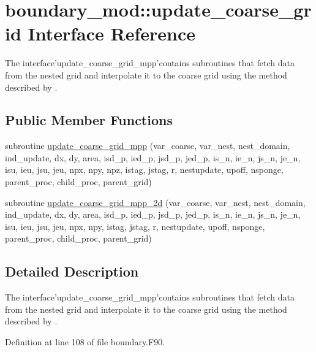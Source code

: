 \section{boundary\-\_\-mod\-:\-:update\-\_\-coarse\-\_\-grid Interface Reference}
\label{interfaceboundary__mod_1_1update__coarse__grid}


The interface'update\-\_\-coarse\-\_\-grid\-\_\-mpp'contains subroutines that fetch data from the nested grid and interpolate it to the coarse grid using the method described by \cite{harris2013two}.  


\subsection*{Public Member Functions}
\begin{DoxyCompactItemize}
\item 
subroutine \hyperlink{interfaceboundary__mod_1_1update__coarse__grid_a6d38bb2a38da012a2464e7255edd6983}{update\-\_\-coarse\-\_\-grid\-\_\-mpp} (var\-\_\-coarse, var\-\_\-nest, nest\-\_\-domain, ind\-\_\-update, dx, dy, area, isd\-\_\-p, ied\-\_\-p, jsd\-\_\-p, jed\-\_\-p, is\-\_\-n, ie\-\_\-n, js\-\_\-n, je\-\_\-n, isu, ieu, jsu, jeu, npx, npy, npz, istag, jstag, r, nestupdate, upoff, nsponge, parent\-\_\-proc, child\-\_\-proc, parent\-\_\-grid)
\item 
subroutine \hyperlink{interfaceboundary__mod_1_1update__coarse__grid_a5a1f8f85dffe389683e8a41333195114}{update\-\_\-coarse\-\_\-grid\-\_\-mpp\-\_\-2d} (var\-\_\-coarse, var\-\_\-nest, nest\-\_\-domain, ind\-\_\-update, dx, dy, area, isd\-\_\-p, ied\-\_\-p, jsd\-\_\-p, jed\-\_\-p, is\-\_\-n, ie\-\_\-n, js\-\_\-n, je\-\_\-n, isu, ieu, jsu, jeu, npx, npy, istag, jstag, r, nestupdate, upoff, nsponge, parent\-\_\-proc, child\-\_\-proc, parent\-\_\-grid)
\end{DoxyCompactItemize}


\subsection{Detailed Description}
The interface'update\-\_\-coarse\-\_\-grid\-\_\-mpp'contains subroutines that fetch data from the nested grid and interpolate it to the coarse grid using the method described by \cite{harris2013two}. 

Definition at line 108 of file boundary.\-F90.



